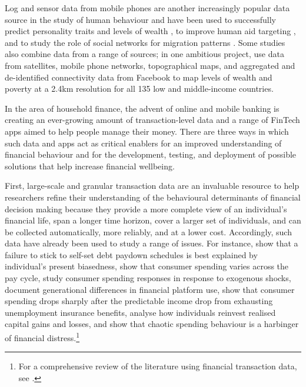 Log and sensor data from mobile phones are another increasingly popular data source in the study of human behaviour and have been used to successfully predict personality traits
\citep{montjoye2013predicting, stachl2020predicting} and levels of wealth
\citep{blumenstock2015predicting}, to improve human aid targeting
\citep{aiken2022machine}, and to study the role of social networks for migration
patterns \citep{blumenstock2019migration}. Some studies also combine data from
a range of sources; in one ambitious project, \citet{chi2022microestimates} use
data from satellites, mobile phone networks, topographical maps, and aggregated
and de-identified connectivity data from Facebook to map levels of wealth and
poverty at a 2.4km resolution for all 135 low and middle-income countries.

In the area of household finance, the advent of online and mobile banking is
creating an ever-growing amount of transaction-level data and a range of
FinTech apps aimed to help people manage their money. There are three ways in
which such data and apps act as critical enablers for an improved understanding
of financial behaviour and for the development, testing, and deployment of
possible solutions that help increase financial wellbeing.

First, large-scale and granular transaction data are an invaluable resource to
help researchers refine their understanding of the behavioural determinants of
financial decision making because they provide a more complete view of an individual's financial life, span a longer time
horizon, cover a larger set of individuals, and can be collected automatically, more reliably, and at a lower cost. Accordingly, such data have already been used to study a range of issues. For instance, \citet{kuchler2020sticking}
show that a failure to stick to self-set debt paydown schedules is best
explained by individual's present biasedness, \citet{gelman2014harnessing,olafsson2018liquid} show that consumer spending
varies across the pay cycle, \citet{baker2018debt,baugh2014disentangling} study
consumer spending responses in response to exogenous shocks,
\citet{carlin2019generational} document generational differences in financial
platform use, \citet{ganong2019consumer} show that consumer spending drops
sharply after the predictable income drop from exhausting unemployment
insurance benefits, \citet{meyer2018fully} analyse how individuals reinvest
realised capital gains and losses, and \citet{muggleton2020evidence} show that
chaotic spending behaviour is a harbinger of financial distress.\footnote{For a
    comprehensive review of the literature using financial transaction data,
see \citet{baker2022household}.}

